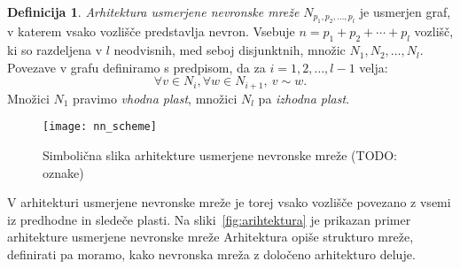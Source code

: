 \documentclass[12pt,a4paper,twoside]{article}
\theoremstyle{definition} %
\newtheorem{definicija}{Definicija}[section]
\theoremstyle{plain} %
\numberwithin{equation}{section}  %
\begin{document}
\begin{definicija}
\label{def:arhitektura}
	\emph{Arhitektura usmerjene nevronske mreže} $N_{p_1,p_2,\ldots,p_l}$ je usmerjen graf, v katerem vsako vozlišče predstavlja nevron. 
	Vsebuje $n= p_1+p_2+\cdots+p_l$ vozlišč, ki so razdeljena v $l$ neodvisnih, med seboj disjunktnih, množic $N_1, N_2, \ldots, N_l$. 
	Povezave v grafu definiramo s predpisom, da za $i=1,2,\ldots,l-1$ velja:
	\[
	\forall v \in N_i, \forall w \in N_{i+1},\ v \sim w.
	\]
	Množici $N_1$ pravimo \emph{vhodna plast}, množici $N_l$ pa \emph{izhodna plast}.
\end{definicija}

\begin{figure}[h!]
	\centering
	\texttt{[image: nn\_scheme]}
	\caption[Slika arhitekture usmerjene nevronske mreŽe]{Simbolična slika arhitekture usmerjene nevronske mreže (TODO: oznake)}
	\label{fig:arhitektura}
\end{figure}

V arhitekturi usmerjene nevronske mreže je torej vsako vozlišče povezano z vsemi iz predhodne in sledeče plasti.
Na sliki~\ref{fig:arihtektura} je prikazan primer arhitekture usmerjene nevronske mreže
Arhitektura opiše strukturo mreže, definirati pa moramo, kako nevronska mreža z določeno arhitekturo deluje.
\end{document}
